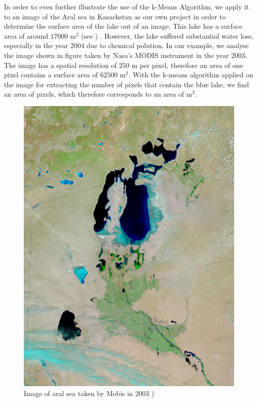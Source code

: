 In order to even further illustrate the use of the k-Means Algorithm, we apply it to an image of the Aral sea in Kasachstan as our own project in order to determine the surface area of the lake out of an image. This lake has a surface area of around  $17000\text{ m}^{2}$ (see \protect\footnotemark)  . However, the lake suffered substantial water loss, especially in the year 2004 due to chemical polution. In our example, we analyse the image shown in figure  taken by Nasa's MODIS instrument in the year 2003. The image has a spatial resolution of $250$ m per pixel, therefore an area of one pixel contains a surface area of $62500\text{ m}^{2}$. With the k-means algorithm applied on the image for extracting the number of pixels that contain the blue lake, we find an area of   pixels, which therefore corresponds to an area of   $\text{m}^{2}$. 

\begin{figure}[H]
	\centering
	\includegraphics[scale=0.05]{images/aralsee250mperpixel.jpg}
	\caption{Image of aral sea taken by Mobis in 2003 \protect\footnotemark)  }
	\label{fig:kmeans}
\end{figure}

